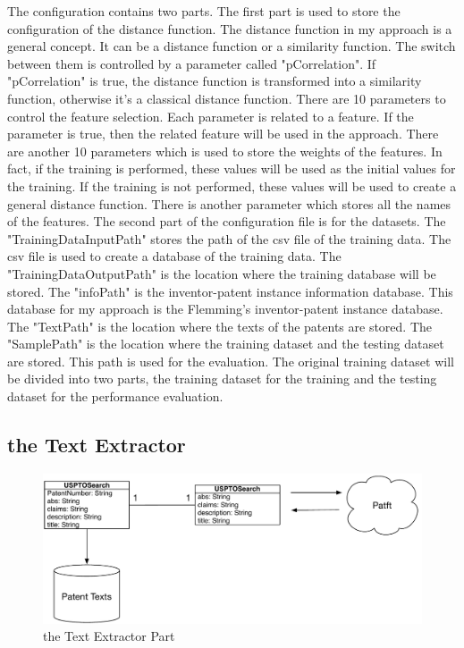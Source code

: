 The configuration contains two parts. The first part is used to store the configuration of the distance function. The distance function in my approach is a general concept. It can be a distance function or a similarity function. The switch between them is controlled by a parameter called "pCorrelation". If "pCorrelation" is true, the distance function is transformed into a similarity function, otherwise it's a classical distance function. There are 10 parameters to control the feature selection. Each parameter is related to a feature. If the parameter is true, then the related feature will be used in the approach. There are another 10 parameters which is used to store the weights of the features. In fact, if the training is performed, these values will be used as the initial values for the training. If the training is not performed, these values will be used to create a general distance function.  There is another parameter which stores all the names of the features. The second part of the configuration file is for the datasets. The "TrainingDataInputPath" stores the path of the csv file of the training data. The csv file is used to create a database of the training data. The "TrainingDataOutputPath" is the location where the training database will be stored. The "infoPath" is the inventor-patent instance information database. This database for my approach is the Flemming's inventor-patent instance database. The "TextPath" is the location where the texts of the patents are stored. The "SamplePath" is the location where the training dataset and the testing dataset are stored. This path is used for the evaluation. The original training dataset will be divided into two parts, the training dataset for the training and the testing dataset for the performance evaluation. 

 

\subsection{the Text Extractor}
\begin{figure}
\centering
\includegraphics[scale=0.65]{TextExtractor.pdf}
\caption{the Text Extractor Part}
\end{figure}

